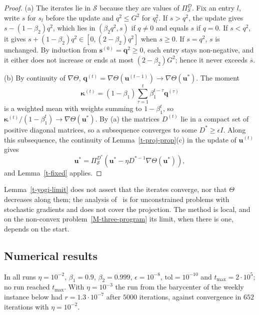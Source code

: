 \documentclass[11pt]{article}
\theoremstyle{plain}
\theoremstyle{remark}
\numberwithin{equation}{section}
\begin{document}
\begin{proof}
(a) The iterates lie in $\mathcal{S}$ because they are values of
$\Pi^D_{\mathcal{S}}$. Fix an entry $l$, write $s$ for $s_l$ before the update
and $q^2\le G^2$ for $q_l^2$. If $s>q^2$, the update gives
$s-(1-\beta_2)q^2$, which lies in $\left(\beta_2q^2,s\right)$ if $q\ne 0$ and
equals $s$ if $q=0$. If $s<q^2$, it gives $s+(1-\beta_2)q^2\in\left[0,(2-\beta_2)q^2\right]$
when $s\ge 0$. If $s=q^2$, $s$ is unchanged. By induction from
$\bm s^{(0)}=\bm q^2\ge 0$, each entry stays non-negative, and it either does
not increase or ends at most $(2-\beta_2)G^2$; hence it never exceeds $\overline{s}$.

(b) By continuity of $\nabla\Theta$,
$\bm q^{(t)}=\nabla\Theta\left(\bm u^{(t-1)}\right)\to\nabla\Theta\left(\bm u^*\right)$.
The moment
\begin{equation*}
\bm\kappa^{(t)}=(1-\beta_1)\sum_{\tau=1}^t\beta_1^{t-\tau}\bm q^{(\tau)}
\end{equation*}
is a weighted mean with weights summing to $1-\beta_1^t$, so
$\bm\kappa^{(t)}/\left(1-\beta_1^t\right)\to\nabla\Theta\left(\bm u^*\right)$.
By (a) the matrices $D^{(t)}$ lie in a compact set of positive diagonal
matrices, so a subsequence converges to some $D^*\ge\epsilon I$. Along this
subsequence, the continuity of Lemma~\ref{t-proj-prop}(c) in the update
of $\bm u^{(t)}$ gives
\begin{equation*}
\bm u^*=\Pi^{D^*}_{\mathcal{S}}\left(\bm u^*-\eta D^{*-1}\nabla\Theta\left(\bm u^*\right)\right),
\end{equation*}
and Lemma~\ref{t-fixed} applies.
\end{proof}

Lemma~\ref{t-yogi-limit} does not assert that the iterates converge, nor
that $\Theta$ decreases along them; the analysis of~\cite{2018Zaheer_Yogi} is
for unconstrained problems with stochastic gradients and does not cover the
projection. The method is local, and on the non-convex
problem~\eqref{M-three-program} its limit, when there is one, depends on the
start.

\subsection{Numerical results}\label{sec-three-numerics}

In all runs $\eta=10^{-2}$, $\beta_1=0.9$, $\beta_2=0.999$,
$\epsilon=10^{-8}$, $\mathrm{tol}=10^{-10}$ and $t_{\max}=2\cdot 10^5$; no run
reached $t_{\max}$. With $\eta=10^{-3}$ the run from the barycenter of the
weekly instance below had $r=1.3\cdot 10^{-7}$ after $5000$ iterations,
against convergence in $652$ iterations with $\eta=10^{-2}$.
\end{document}

